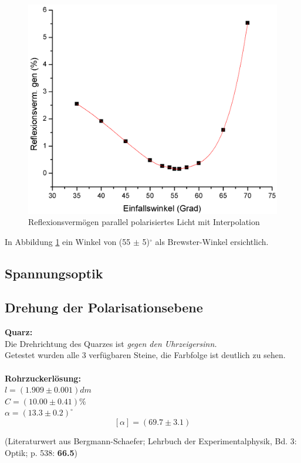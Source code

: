 \documentclass[12pt,a4paper]{article}
\begin{document}
\begin{multicols}{2}
\begin{figure}[H]
	\centering
	\includegraphics[scale=0.28]{./data/R_P_Plot.png}
	\caption{Reflexionsvermögen parallel polarisiertes Licht mit Interpolation}
	\label{fig:r_p_plot}
\end{figure}
In Abbildung \ref{fig:r_p_plot} ein Winkel von (55 $\pm$ 5)$^\circ$ als Brewster-Winkel ersichtlich.
\subsection{Spannungsoptik}




\subsection{Drehung der Polarisationsebene}

\textbf{Quarz:}\\
Die Drehrichtung des Quarzes ist \emph{gegen den Uhrzeigersinn.} \\
Getestet wurden alle 3 verfügbaren Steine, die Farbfolge ist deutlich zu sehen.\\
\\
\textbf{Rohrzuckerlösung:}\\
$l=(1.909\pm 0.001)dm$\\
$C = (10.00 \pm 0.41)\%$\\
$\alpha = (13.3 \pm 0.2)^\circ$
$$[\alpha] = (69.7 \pm 3.1)$$

(Literaturwert aus Bergmann-Schaefer; Lehrbuch der Experimentalphysik, Bd. 3: Optik; p. 538: \textbf{66.5})


\end{multicols}
\end{document}
